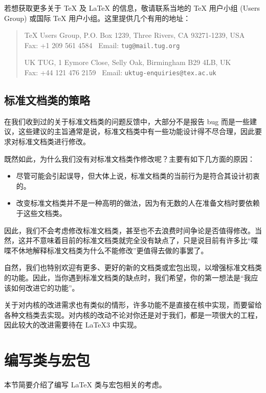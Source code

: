 \documentclass{ltxguide}[1995/11/28]
\begin{document}
若想获取更多关于 \TeX{} 及 \LaTeX{} 的信息，敬请联系当地的 \TeX{} 用户小组 (Users Group) 或国际 \TeX{} 用户小组。这里提供几个有用的地址：
\begin{quote}\small\label{addrs}
   \TeX{} Users Group, P.O. Box 1239, Three Rivers, CA 93271-1239, USA\\
   Fax: +1 209 561 4584 \ Email: \texttt{tug@mail.tug.org}

   UK TUG, 1 Eymore Close, Selly Oak, Birmingham B29 4LB, UK\\
   Fax: +44 121 476 2159 \ Email: \texttt{uktug-enquiries@tex.ac.uk}
\end{quote}


\subsection{标准文档类的策略}

在我们收到过的关于标准文档类的问题反馈中，大部分不是报告 bug 而是一些建议，这些建议的主旨通常是说，标准文档类中有一些功能设计得不尽合理，因此要求对标准文档类进行修改。

既然如此，为什么我们没有对标准文档类作修改呢？主要有如下几方面的原因：
\begin{itemize}
\item
  尽管可能会引起误导，但大体上说，标准文档类的当前行为是符合其设计初衷的。
\item
  改变标准文档类并不是一种高明的做法，因为有无数的人在准备文档时要依赖于这些文档类。
\end{itemize}

因此，我们不会考虑修改标准文档类，甚至也不去浪费时间争论是否值得修改。当然，这并不意味着目前的标准文档类就完全没有缺点了，只是说目前有许多比“喋喋不休地解释标准文档类为什么不能修改”更值得去做的事罢了。

自然，我们也特别欢迎有更多、更好的新的文档类或宏包出现，以增强标准文档类的功能。因此，当你遇到标准文档类的缺点时，我们希望，你的第一想法是“我应该如何改进它的功能”。

关于对内核的改进需求也有类似的情形，许多功能不是直接在核中实现，而要留给各种文档类去实现。对内核的改动不论对你还是对于我们，都是一项很大的工程，因此较大的改进需要待在 \LaTeX3{} 中实现。

\section{编写类与宏包}
\label{Sec:writing}

本节简要介绍了编写 \LaTeX{} 类与宏包相关的考虑。
\end{document}
